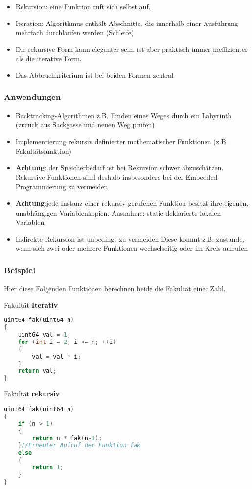 \begin{itemize}[itemsep=1pt, parsep=0pt]
    \item Rekursion: eine Funktion ruft sich selbst auf.
    \item Iteration: Algorithmus enthält Abschnitte, die innerhalb einer Ausführung mehrfach durchlaufen werden (Schleife)
    \item Die rekursive Form kann eleganter sein, ist aber praktisch immer ineffizienter als die iterative Form.
    \item Das Abbruchkriterium ist bei beiden Formen zentral
\end{itemize}

\subsubsection{Anwendungen}
\begin{itemize}[itemsep=1pt, parsep=0pt]

    \item Backtracking-Algorithmen z.B. Finden eines Weges durch ein Labyrinth (zurück aus Sackgasse und neuen Weg prüfen)
    \item Implementierung rekursiv definierter mathematischer Funktionen (z.B. Fakultätsfunktion)
    \item \textbf{Achtung}: der Speicherbedarf ist bei Rekursion schwer abzuschätzen. Rekursive Funktionen sind deshalb insbesondere bei der Embedded Programmierung zu vermeiden.
    \item \textbf{Achtung}:jede Instanz einer rekursiv gerufenen Funktion besitzt ihre eigenen, unabhängigen Variablenkopien. Ausnahme: static-deklarierte lokalen Variablen
    \item Indirekte Rekursion ist unbedingt zu vermeiden Diese kommt z.B. zustande, wenn sich zwei oder mehrere Funktionen wechselseitig oder im Kreis aufrufen
\end{itemize}

\nextcol

\subsubsection{Beispiel}

Hier diese Folgenden Funktionen berechnen beide die Fakultät einer Zahl.\\

\noindent
\begin{minipage}[t]{0.5\columnwidth}
Fakultät \textbf{Iterativ}
\begin{lstlisting}[language = c]
uint64 fak(uint64 n)
{
    uint64 val = 1;
    for (int i = 2; i <= n; ++i)
    {
        val = val * i;
    }
    return val;
}
\end{lstlisting}
\end{minipage}
\begin{minipage}[t]{0.5\columnwidth}
Fakultät \textbf{rekursiv}
\begin{lstlisting}[language = c]
uint64 fak(uint64 n)
{
    if (n > 1)
    {
        return n * fak(n-1);
    }//Erneuter Aufruf der Funktion fak
    else
    {
        return 1;
    }
}
\end{lstlisting}
\end{minipage}
